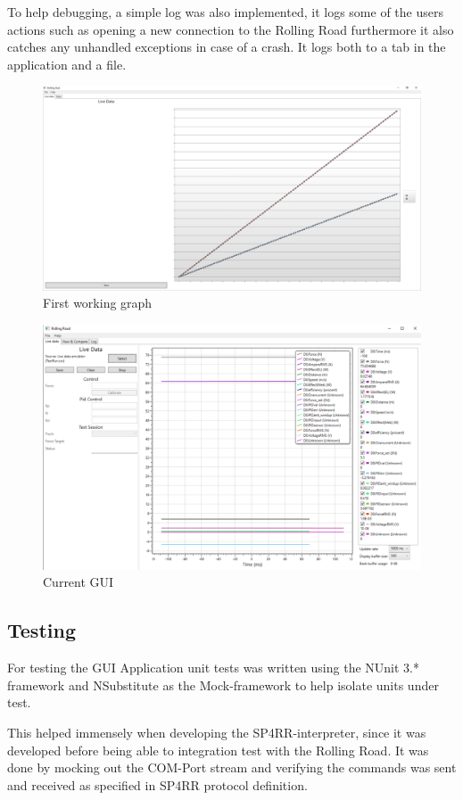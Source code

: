 
To help debugging, a simple log was also implemented, it logs some of the users actions such as opening a new connection to the Rolling Road furthermore it also catches any unhandled exceptions in case of a crash. It logs both to a tab in the application and a file.

\begin{figure}[h!]
\centering
\includegraphics[width=0.7\linewidth]{SubPages/Images/First_GUI}
\caption{First working graph}
\label{fig:First_GUI}
\end{figure}

\begin{figure}[h!]
\centering
\includegraphics[width=0.7\linewidth]{SubPages/Images/Current_GUI}
\caption{Current GUI}
\label{fig:Current_GUI}
\end{figure}


\subsection{Testing}

For testing the GUI Application unit tests was written using the NUnit 3.* framework and NSubstitute as the Mock-framework to help isolate units under test.

This helped immensely when developing the SP4RR-interpreter, since it was developed before being able to integration test with the Rolling Road. It was done by mocking out the COM-Port stream and verifying the commands was sent and received as specified in SP4RR protocol definition.

